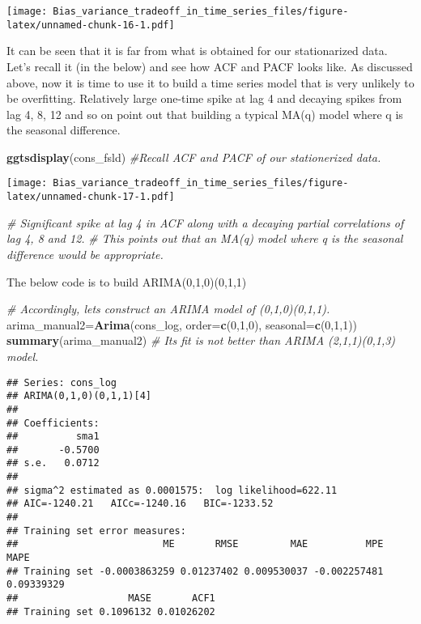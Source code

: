 \documentclass[
]{article}
\newenvironment{Shaded}{\begin{snugshade}}{\end{snugshade}}
\newcommand{\CommentTok}[1]{\textcolor[rgb]{0.56,0.35,0.01}{\textit{#1}}}
\newcommand{\DataTypeTok}[1]{\textcolor[rgb]{0.13,0.29,0.53}{#1}}
\newcommand{\DecValTok}[1]{\textcolor[rgb]{0.00,0.00,0.81}{#1}}
\newcommand{\KeywordTok}[1]{\textcolor[rgb]{0.13,0.29,0.53}{\textbf{#1}}}
\newcommand{\NormalTok}[1]{#1}
\begin{document}
\texttt{[image: Bias\_variance\_tradeoff\_in\_time\_series\_files/figure-latex/unnamed-chunk-16-1.pdf]}

It can be seen that it is far from what is obtained for our
stationarized data. Let's recall it (in the below) and see how ACF and
PACF looks like. As discussed above, now it is time to use it to build a
time series model that is very unlikely to be overfitting. Relatively
large one-time spike at lag 4 and decaying spikes from lag 4, 8, 12 and
so on point out that building a typical MA(q) model where q is the
seasonal difference.

\begin{Shaded}
\begin{Highlighting}[]
\KeywordTok{ggtsdisplay}\NormalTok{(cons_fsld) }\CommentTok{#Recall ACF and PACF of our stationerized data.}
\end{Highlighting}
\end{Shaded}

\texttt{[image: Bias\_variance\_tradeoff\_in\_time\_series\_files/figure-latex/unnamed-chunk-17-1.pdf]}

\begin{Shaded}
\begin{Highlighting}[]
\CommentTok{# Significant spike at lag 4 in ACF along with a decaying partial correlations of lag 4, 8 and 12.}
\CommentTok{# This points out that an MA(q) model where q is the seasonal difference would be appropriate.}
\end{Highlighting}
\end{Shaded}

The below code is to build ARIMA(0,1,0)(0,1,1)

\begin{Shaded}
\begin{Highlighting}[]
\CommentTok{# Accordingly, lets construct an ARIMA model of (0,1,0)(0,1,1).}
\NormalTok{arima_manual2=}\KeywordTok{Arima}\NormalTok{(cons_log, }\DataTypeTok{order=}\KeywordTok{c}\NormalTok{(}\DecValTok{0}\NormalTok{,}\DecValTok{1}\NormalTok{,}\DecValTok{0}\NormalTok{), }\DataTypeTok{seasonal=}\KeywordTok{c}\NormalTok{(}\DecValTok{0}\NormalTok{,}\DecValTok{1}\NormalTok{,}\DecValTok{1}\NormalTok{))}
\KeywordTok{summary}\NormalTok{(arima_manual2) }\CommentTok{# Its fit is not better than ARIMA (2,1,1)(0,1,3) model.}
\end{Highlighting}
\end{Shaded}

\begin{verbatim}
## Series: cons_log 
## ARIMA(0,1,0)(0,1,1)[4] 
## 
## Coefficients:
##          sma1
##       -0.5700
## s.e.   0.0712
## 
## sigma^2 estimated as 0.0001575:  log likelihood=622.11
## AIC=-1240.21   AICc=-1240.16   BIC=-1233.52
## 
## Training set error measures:
##                         ME       RMSE         MAE          MPE       MAPE
## Training set -0.0003863259 0.01237402 0.009530037 -0.002257481 0.09339329
##                   MASE       ACF1
## Training set 0.1096132 0.01026202
\end{verbatim}
\end{document}
